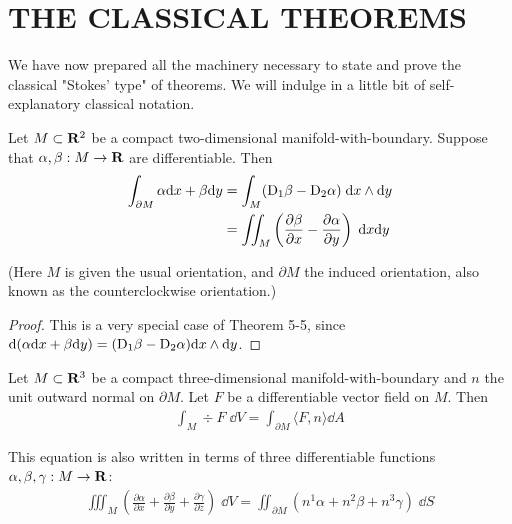 \clearpage
\section{THE CLASSICAL THEOREMS}
We have now prepared all the machinery necessary to state and prove the 
classical "Stokes' type" of theorems. We will indulge in a little bit of 
self-explanatory classical notation.

\begin{theorem}
    Let $M \subset \mathbf{R}^2$ be a compact two-dimensional manifold-with-boundary.
    Suppose that $\alpha,\beta:M\to\mathbf{R}$ are differentiable. Then
    \begin{align*}
        \int_{\partial M}\alpha \mathrm{d} x+\beta \mathrm{d} y
        & = \int_{M}(\mathrm{D}_1\beta-\mathrm{D}_2\alpha)\;\mathrm{d} x\wedge\mathrm{d} y \\
        & = \iint_{M}\left(\frac{\partial\beta}{\partial x}-\frac{\partial\alpha}{\partial y}\right)\;\mathrm{d} x\mathrm{d} y
    \end{align*}
\end{theorem}

(Here $M$ is given the usual orientation, and $\partial M$ the induced
orientation, also known as the counterclockwise orientation.)

\begin{proof}
    This is a very special case of Theorem 5-5, 
    since $\mathrm{d}(\alpha\mathrm{d} x + \beta\mathrm{d} y) =(\mathrm{D}_1\beta-\mathrm{D}_2\alpha)\mathrm{d} x\wedge\mathrm{d} y$.
\end{proof}

\begin{theorem}
    Let $M\subset\mathbf{R}^3$ be a compact three-dimensional manifold-with-boundary and $n$ the
    unit outward normal on $\partial M$. Let $F$ be a differentiable vector field on $M$. Then
    \begin{align*}
        \int_M\div F\;\dd V = \int_{\partial M}\langle F,n\rangle\dd A
    \end{align*}

    This equation is also written in terms of three differentiable 
    functions $\alpha,\beta,\gamma:M\to\mathbf{R}$:
    \begin{align*}
        \iiint_M\left(\frac{\partial\alpha}{\partial x}+\frac{\partial\beta}{\partial y}+\frac{\partial\gamma}{\partial z}\right)\;\dd V
        = \iint_{\partial M}(n^1\alpha+n^2\beta+n^3\gamma)\;\dd S    
    \end{align*}
\end{theorem}

